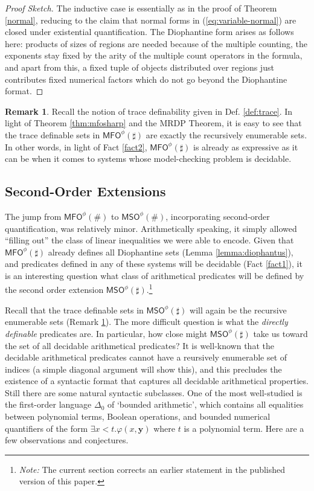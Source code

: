 \documentclass[12pt,oneside,reqno]{amsart}
\theoremstyle{definition}
\newtheorem{remark}{Remark}
\begin{document}
\begin{proof}[Proof Sketch]
The inductive case is essentially as in the proof of Theorem \ref{normal}, reducing to the claim that normal forms in (\ref{eq:variable-normal}) are closed under existential quantification. The Diophantine form arises as follows here: products of sizes of regions are needed because of the multiple counting, the exponents stay fixed by the arity of the multiple count operators in the formula, and apart from this, a fixed tuple of objects distributed over regions just contributes fixed numerical factors which do not go beyond the Diophantine format.
\end{proof}

\begin{remark} \label{remark:trac} Recall the notion of trace definability given in Def. \ref{def:trace}. In light of Theorem \ref{thm:mfosharp} and the MRDP Theorem, it is easy to see that the trace definable sets in $\mathsf{MFO}^\phi(\sharp)$ are exactly the recursively enumerable sets. In other words, in light of Fact \ref{fact2}, $\mathsf{MFO}^\phi(\sharp)$ is already as expressive as it can be when it comes to systems whose model-checking problem is decidable. 
\end{remark}

\subsection{Second-Order Extensions} The jump from $\mathsf{MFO}^\phi(\#)$ to $\mathsf{MSO}^\phi(\#)$, incorporating second-order quantification, was relatively minor. Arithmetically speaking, it simply allowed ``filling out'' the class of linear inequalities we were able to encode. Given that $\mathsf{MFO}^{\phi}(\sharp)$ already defines all Diophantine sets (Lemma \ref{lemma:diophantus}), and predicates defined in any of these systems will be decidable (Fact \ref{fact1}), it is an interesting question what class of arithmetical predicates will be defined by the second order extension $\mathsf{MSO}^{\phi}(\sharp)$.\footnote{\emph{Note:} The current section corrects an earlier statement in the published version of this paper.}  

Recall that the trace definable sets in $\mathsf{MSO}^{\phi}(\sharp)$ will again be the recursive enumerable sets (Remark \ref{remark:trac}). The more difficult question is what the \emph{directly definable} predicates are. In particular, how close might $\mathsf{MSO}^{\phi}(\sharp)$ take us toward the set of all decidable arithmetical predicates? It is well-known that the decidable arithmetical predicates cannot have a reursively enumerable set of indices (a simple diagonal argument will show this), and this precludes the existence of a syntactic format that captures all decidable arithmetical properties. Still there are some natural syntactic subclasses. One of the most well-studied is the first-order language $\Delta_0$ of `bounded arithmetic', which contains all equalities between polynomial terms, Boolean operations, and bounded numerical quantifiers of the form $\exists x < t. \varphi(x, \textbf{y})$ where $t$ is a polynomial term. Here are a few observations and conjectures.
\end{document}
